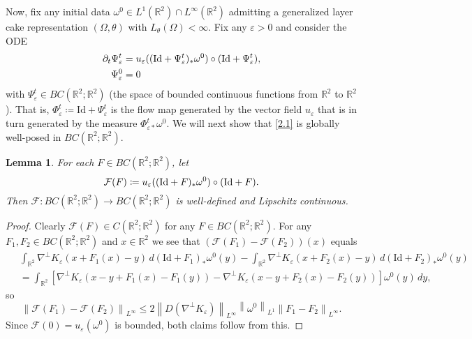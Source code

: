 \documentclass[reqno,centertags,12pt]{amsart}
\newtheorem{lemma}[theorem]{Lemma}
\theoremstyle{definition}
\numberwithin{equation}{section}
\newcommand{\norm}[1]{\left\|#1\right\|}
\newcommand{\bbR}{{\mathbb{R}}}
\newcommand{\eps}{\varepsilon}
\newcommand{\tht}{\theta}
\begin{document}
Now, fix any initial data $\omega^{0}\in L^{1}(\bbR^{2})\cap L^{\infty}(\bbR^{2})$
admitting a generalized layer cake representation
$(\Omega,\theta)$ with $L_{\tht}(\Omega) < \infty$.
Fix any $\eps>0$ and consider the ODE
\begin{equation}\label{2.1}
        \begin{aligned}
            \partial_{t}\Psi_{\eps}^{t}
            &= u_{\eps}((\mathrm{Id} + \Psi_{\eps}^{t})_{*}\omega^{0}) \circ ({\rm Id} + \Psi_{\eps}^{t}), \\
            \Psi_{\eps}^{0} &= 0
        \end{aligned}
\end{equation}
with $\Psi_\eps^t \in BC(\bbR^{2};\bbR^{2})$ (the space of bounded continuous functions from $\bbR^{2}$ to $\bbR^{2}$).
That is, $\Phi_{\eps}^{t}\coloneqq \mathrm{Id} + \Psi_{\eps}^{t}$
is the flow map generated by the vector field
$u_{\eps}$ that is in turn generated by the measure $\Phi_{\eps *}^{t}\omega^{0}$. We will next show that \eqref{2.1} is globally well-posed in $BC(\bbR^{2};\bbR^{2})$.

\begin{lemma}\label{L2.4}
    For each $F\in BC(\bbR^{2};\bbR^{2})$, let
    \[
        \mathcal{F}(F) \coloneqq u_{\eps}((\mathrm{Id} + F)_{*}\omega^{0})\circ ({\rm Id} + F).
    \]
    Then $\mathcal{F}\colon    BC(\bbR^{2};\bbR^{2})\to BC(\bbR^{2};\bbR^{2})$
    is well-defined and  Lipschitz continuous.
\end{lemma}

\begin{proof}
    Clearly $\mathcal{F}(F)\in C(\bbR^{2}; \bbR^{2})$
    for any $F\in BC(\bbR^{2};\bbR^{2})$.
    For any $F_{1},F_{2}\in BC(\bbR^{2};\bbR^{2})$ and $x\in\bbR^{2}$ we see that $(\mathcal{F}(F_{1}) - \mathcal{F}(F_{2}))(x)$ equals
    \begin{equation*}
        \begin{aligned}
&\             \int_{\bbR^{2}} \nabla^{\perp}K_{\eps}(x + F_{1}(x) - y)
            \,d(\mathrm{Id} + F_{1})_{*}\omega^{0}(y)
            - \int_{\bbR^{2}} \nabla^{\perp}K_{\eps}(x + F_{2}(x) - y)
            \,d(\mathrm{Id} + F_{2})_{*}\omega^{0}(y)
            \\&\ 
            = \int_{\bbR^{2}}
            \left[
                \nabla^{\perp}K_{\eps}(x - y + F_{1}(x) - F_{1}(y))
                - \nabla^{\perp}K_{\eps}(x - y + F_{2}(x) - F_{2}(y))
            \right]
            \omega^{0}(y)\,dy,
        \end{aligned}
    \end{equation*}
    so
    \[
        \norm{\mathcal{F}(F_{1}) - \mathcal{F}(F_{2})}_{L^{\infty}}
        \leq 2\norm{D(\nabla^{\perp}K_{\eps})}_{L^{\infty}}\norm{\omega^{0}}_{L^{1}}
        \norm{F_{1} - F_{2}}_{L^{\infty}}.
    \]
    Since $\mathcal{F}(0) = u_{\eps}(\omega^{0})$ is bounded,
    both claims follow from this.
\end{proof}
\end{document}
